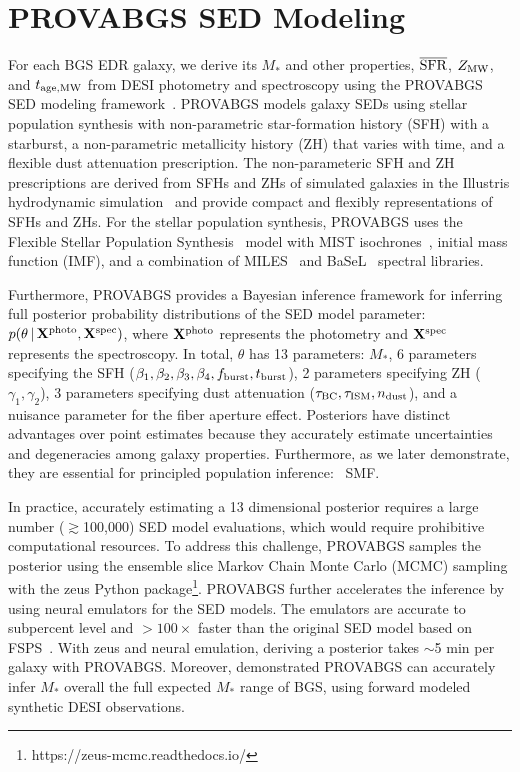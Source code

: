 \section{PROVABGS SED Modeling} \label{sec:provabgs}
For each BGS EDR galaxy, we derive its $M_*$ and other properties,
$\overline{\rm SFR}$, $Z_{\rm MW}$, and $t_{\rm age, MW}$ from DESI
photometry and spectroscopy using the PROVABGS SED modeling
framework~\citep{hahn2022}.  
PROVABGS models galaxy SEDs using stellar population synthesis with
non-parametric star-formation history (SFH) with a starburst, a non-parametric
metallicity history (ZH) that varies with time, and a flexible dust
attenuation prescription.
The non-parameteric SFH and ZH prescriptions are derived from SFHs and ZHs of
simulated galaxies in the Illustris hydrodynamic
simulation~\citep{vogelsberger2014, genel2014, nelson2015} and provide compact 
and flexibly representations of SFHs and ZHs.
For the stellar population synthesis, PROVABGS uses the Flexible Stellar
Population Synthesis~\citep[FSPS;][]{conroy2009, conroy2010b} model with MIST
isochrones~\citep{paxton2011, paxton2013, paxton2015, choi2016, dotter2016},
\cite{chabrier2003} initial mass function (IMF), and a combination of
MILES~\citep{sanchez-blazquez2006} and BaSeL~\citep{lejeune1997, lejeune1998,
westera2002} spectral libraries.

Furthermore, PROVABGS provides a Bayesian inference framework for inferring
full posterior probability distributions of the SED model parameter:
$p(\theta\,|\, {\bf X}^{\rm photo}, {\bf X}^{\rm spec})$, where ${\bf X}^{\rm
photo}$ represents the photometry and ${\bf X}^{\rm spec}$ represents the
spectroscopy. 
In total, $\theta$ has 13 parameters: $M_*$, 6 parameters specifying the SFH
($\beta_1, \beta_2, \beta_3, \beta_4, f_{\rm burst}, t_{\rm burst}$), 2
parameters specifying ZH ($\gamma_1, \gamma_2$), 3 parameters specifying
dust attenuation ($\tau_{\rm BC}, \tau_{\rm ISM}, n_{\rm dust}$), and a
nuisance parameter for the fiber aperture effect. 
Posteriors have distinct advantages over point estimates because they
accurately estimate uncertainties and degeneracies among galaxy properties.
Furthermore, as we later demonstrate, they are essential for principled
population inference: \eg~SMF.  

In practice, accurately estimating a 13 dimensional posterior requires a large
number ($\gtrsim$100,000) SED model evaluations, which would require
prohibitive computational resources. 
To address this challenge, PROVABGS samples the posterior using the
\cite{karamanis2020} ensemble slice Markov Chain Monte Carlo (MCMC) sampling
with the {\sc zeus} Python package\footnote{https://zeus-mcmc.readthedocs.io/}.
PROVABGS further accelerates the inference by using neural emulators for the
SED models. 
The emulators are accurate to subpercent level and $>100\times$ faster than the
original SED model based on FSPS~\citep{kwon2022}. 
With {\sc zeus} and neural emulation, deriving a posterior takes $\sim$5 min
per galaxy with PROVABGS.
Moreover, \cite{hahn2022} demonstrated PROVABGS can accurately infer $M_*$
overall the full expected $M_*$ range of BGS, using forward modeled synthetic
DESI observations. 

